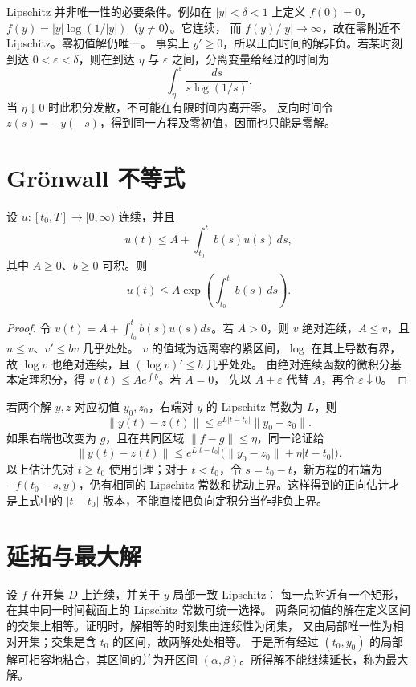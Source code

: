 Lipschitz 并非唯一性的必要条件。例如在 \(|y|<\delta<1\) 上定义
\(f(0)=0\)，\(f(y)=|y|\log(1/|y|)\)（\(y\ne0\)）。它连续，
而 \(f(y)/|y|\to\infty\)，故在零附近不 Lipschitz。零初值解仍唯一。
事实上 \(y'\ge0\)，所以正向时间的解非负。若某时刻到达
\(0<\varepsilon<\delta\)，则在到达 \(\eta\) 与 \(\varepsilon\)
之间，分离变量给经过的时间为
\[
 \int_\eta^\varepsilon\frac{ds}{s\log(1/s)}.
\]
当 \(\eta\downarrow0\) 时此积分发散，不可能在有限时间内离开零。
反向时间令 \(z(s)=-y(-s)\)，得到同一方程及零初值，因而也只能是零解。

\section{Grönwall 不等式}

\begin{lemma}\label{lem:gronwall}
设 \(u:[t_0,T]\to[0,\infty)\) 连续，并且
\[
 u(t)\le A+\int_{t_0}^{t}b(s)u(s)\,ds,
\]
其中 \(A\ge0\)、\(b\ge0\) 可积。则
\[
 u(t)\le A\exp\!\left(\int_{t_0}^{t}b(s)\,ds\right).
\]
\end{lemma}
\begin{proof}
令 \(v(t)=A+\int_{t_0}^{t}b(s)u(s)ds\)。若 \(A>0\)，则
\(v\) 绝对连续，\(A\le v\)，且 \(u\le v\)、\(v'\le bv\) 几乎处处。
\(v\) 的值域为远离零的紧区间，\(\log\) 在其上导数有界，故
\(\log v\) 也绝对连续，且 \((\log v)'\le b\) 几乎处处。
由绝对连续函数的微积分基本定理积分，得 \(v(t)\le A e^{\int b}\)。若 \(A=0\)，
先以 \(A+\varepsilon\) 代替 \(A\)，再令 \(\varepsilon\downarrow0\)。
\end{proof}

若两个解 \(y,z\) 对应初值 \(y_0,z_0\)，右端对 \(y\) 的 Lipschitz 常数为
\(L\)，则
\begin{equation}\label{eq:ode-initial-dependence}
 \|y(t)-z(t)\|\le e^{L|t-t_0|}\|y_0-z_0\|.
\end{equation}
如果右端也改变为 \(g\)，且在共同区域
\(\|f-g\|\le\eta\)，同一论证给
\[
 \|y(t)-z(t)\|
 \le e^{L|t-t_0|}\bigl(\|y_0-z_0\|+\eta|t-t_0|\bigr).
\]
以上估计先对 \(t\ge t_0\) 使用引理；对于 \(t<t_0\)，令
\(s=t_0-t\)，新方程的右端为 \(-f(t_0-s,y)\)，仍有相同的
Lipschitz 常数和扰动上界。这样得到的正向估计才是上式中的
\(|t-t_0|\) 版本，不能直接把负向定积分当作非负上界。

\section{延拓与最大解}

设 \(f\) 在开集 \(D\) 上连续，并关于 \(y\) 局部一致 Lipschitz：
每一点附近有一个矩形，在其中同一时间截面上的 Lipschitz 常数可统一选择。
两条同初值的解在定义区间的交集上相等。证明时，解相等的时刻集由连续性为闭集，
又由局部唯一性为相对开集；交集是含 \(t_0\) 的区间，故两解处处相等。
于是所有经过 \((t_0,y_0)\) 的局部解可相容地粘合，其区间的并为开区间
\((\alpha,\beta)\)。所得解不能继续延长，称为最大解。

